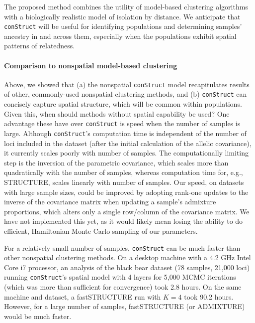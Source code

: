 \documentclass[12pt]{article}
\begin{document}
The proposed method combines the utility of model-based clustering algorithms 
with a biologically realistic model of isolation by distance.
We anticipate that \texttt{conStruct} will be useful for identifying populations 
and determining samples' ancestry in and across them, 
especially when the populations exhibit spatial patterns of relatedness.

\paragraph{Comparison to nonspatial model-based clustering}
Above, we showed that 
(a) the nonspatial \texttt{conStruct} model recapitulates results of 
other, commonly-used nonspatial clustering methods,
and 
(b) \texttt{conStruct} can concisely capture spatial structure, which
will be common within populations.
Given this, when should methods without spatial capability be used?
One advantage these have over \texttt{conStruct} is speed when the number of samples is large.
Although \texttt{conStruct}'s computation time is independent
of the number of loci included in the dataset 
(after the initial calculation of the allelic covariance), 
it currently scales poorly with number of samples.
The computationally limiting step is the inversion of the parametric covariance, 
which scales more than quadratically with the number of samples,
whereas computation time for, e.g., STRUCTURE, 
scales linearly with number of samples.
Our speed, on datasets with large sample sizes, 
could be improved by adopting rank-one updates 
to the inverse of the covariance matrix 
\citep[e.g.][]{woodbury1950,sherman_morrison1950}
when updating a sample's admixture proportions, 
which alters only a single row/column of the covariance matrix. 
We have not implemented this yet, 
as it would likely mean losing the ability to do efficient,  
Hamiltonian Monte Carlo sampling of our parameters.

For a relatively small number of samples, 
\texttt{conStruct} can be much faster than other nonspatial clustering methods.
On a desktop machine with a 4.2 GHz Intel Core i7 processor, 
an analysis of the black bear dataset (78 samples, 21,000 loci) 
running \texttt{conStruct}'s spatial model with 4 layers for 5,000 MCMC iterations 
(which was more than sufficient for convergence) 
took 2.8 hours.
On the same machine and dataset, 
a fastSTRUCTURE run with $K=4$ took 90.2 hours.
However, for a large number of samples, 
fastSTRUCTURE (or ADMIXTURE) would be much faster.
\end{document}
